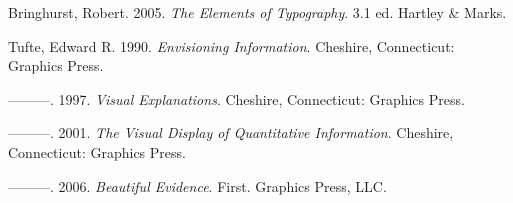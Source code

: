\documentclass[
  twoside,
  symmetric]{tufte-book}
\newlength{\cslhangindent}
\newenvironment{CSLReferences}[2] %
 {\begin{list}{}{%
  \setlength{\itemindent}{0pt}
  \setlength{\leftmargin}{0pt}
  \setlength{\parsep}{0pt}
  \ifodd #1
   \setlength{\leftmargin}{\cslhangindent}
   \setlength{\itemindent}{-1\cslhangindent}
  \fi
  \setlength{\itemsep}{#2\baselineskip}}}
 {\end{list}}
\begin{document}
\label{refs}
\begin{CSLReferences}{1}{0}
Bringhurst, Robert. 2005. \emph{The Elements of Typography}. 3.1 ed.
Hartley \& Marks.

Tufte, Edward R. 1990. \emph{Envisioning Information}. Cheshire,
Connecticut: Graphics Press.

---------. 1997. \emph{Visual Explanations}. Cheshire, Connecticut:
Graphics Press.

---------. 2001. \emph{The Visual Display of Quantitative Information}.
Cheshire, Connecticut: Graphics Press.

---------. 2006. \emph{Beautiful Evidence}. First. Graphics Press,
{LLC}.

\end{CSLReferences}


\backmatter
\end{document}
